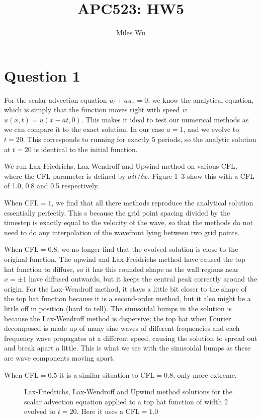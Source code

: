 \documentclass[11pt]{article}
\begin{document}
\title{APC523: HW5}
\author{Miles Wu}
\maketitle

\section{Question 1}
For the scalar advection equation $u_t + a u_x = 0$, we know the analytical equation, which is simply that the function moves right with speed $v$: $u(x, t) = u(x -  a t, 0)$. This makes it ideal to test our numerical methods as we can compare it to the exact solution. In our case $a=1$, and we evolve to $t=20$. This corresponds to running for exactly 5 periods, so the analytic solution at $t=20$ is identical to the initial function.

We run Lax-Friedrichs, Lax-Wendroff and Upwind method on various CFL, where the CFL parameter is defined by $a \delta t / \delta x$. Figure 1--3 show this with a CFL of 1.0, 0.8 and 0.5 respectively.

When CFL$=1$, we find that all there methods reproduce the analytical solution essentially perfectly. This s because the grid point spacing divided by the timestep is exactly equal to the velocity of the wave, so that the methods do not need to do any interpolation of the wavefront lying between two grid points.

When CFL$=0.8$, we no longer find that the evolved solution is close to the original function. The upwind and Lax-Freidrichs method have caused the top hat function to diffuse, so it has this rounded shape as the wall regions near $x=\pm 1$ have diffused outwards, but it keeps the central peak correctly around the origin. For the Lax-Wendroff method, it stays a little bit closer to the shape of the top hat function because it is a second-order method, but it also might be a little off in position (hard to tell). The sinusoidal bumps in the solution is because the Lax-Wendroff method is dispersive; the top hat when Fourier decomposed is made up of many sine waves of different frequencies and each frequency wave propagates at a different speed, causing the solution to spread out and break apart a little. This is what we see with the sinusoidal bumps as these are wave components moving apart.

When CFL$=0.5$ it is a similar situation to CFL$=0.8$, only more extreme.

\begin{figure}
  \centering

  \caption{Lax-Friedrichs, Lax-Wendroff and Upwind method solutions for the scalar advection equation applied to a top hat function of width 2 evolved to $t=20$. Here it uses a CFL$=1.0$}
  \label{multigrid-plot}
\end{figure}
\end{document}
